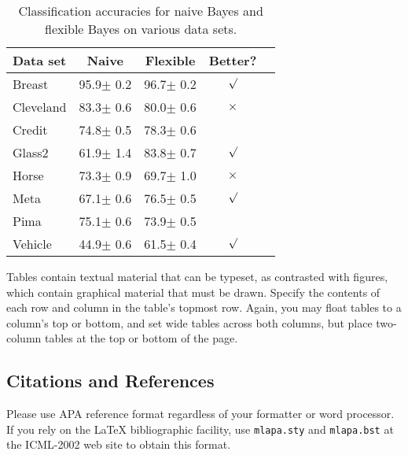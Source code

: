 
\begin{table}[t]
\caption{Classification accuracies for naive Bayes and flexible 
Bayes on various data sets.}
\label{sample-table}
\vskip 0.15in
\begin{center}
\begin{small}
\begin{sc}
\begin{tabular}{lcccr}
\hline
\abovespace\belowspace
Data set & Naive & Flexible & Better? \\
\hline
\abovespace
Breast    & 95.9$\pm$ 0.2& 96.7$\pm$ 0.2& $\surd$ \\
Cleveland & 83.3$\pm$ 0.6& 80.0$\pm$ 0.6& $\times$\\
Credit    & 74.8$\pm$ 0.5& 78.3$\pm$ 0.6&         \\
Glass2    & 61.9$\pm$ 1.4& 83.8$\pm$ 0.7& $\surd$ \\
Horse     & 73.3$\pm$ 0.9& 69.7$\pm$ 1.0& $\times$\\
Meta      & 67.1$\pm$ 0.6& 76.5$\pm$ 0.5& $\surd$ \\
Pima      & 75.1$\pm$ 0.6& 73.9$\pm$ 0.5&         \\
\belowspace
Vehicle   & 44.9$\pm$ 0.6& 61.5$\pm$ 0.4& $\surd$ \\
\hline
\end{tabular}
\end{sc}
\end{small}
\end{center}
\vskip -0.1in
\end{table}

Tables contain textual material that can be typeset, as contrasted 
with figures, which contain graphical material that must be drawn. 
Specify the contents of each row and column in the table's topmost
row. Again, you may float tables to a column's top or bottom, and set
wide tables across both columns, but place two-column tables at the
top or bottom of the page.
 
\subsection{Citations and References} 

Please use APA reference format regardless of your formatter
or word processor. If you rely on the \LaTeX\/ bibliographic 
facility, use {\tt mlapa.sty} and {\tt mlapa.bst} 
at the ICML-2002 web site to obtain this format.

